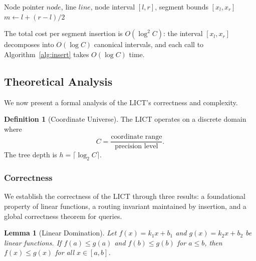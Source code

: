 \documentclass[11pt,a4paper]{article}
\theoremstyle{definition}
\newtheorem{definition}{Definition}
\theoremstyle{plain}
\newtheorem{lemma}{Lemma}
\begin{document}
\begin{algorithm}[H]
\caption{LICT Segment Insertion}
\label{alg:segment-insert}
\begin{algorithmic}[1]
\Require Node pointer $node$, line $line$, node interval $[l, r]$, segment bounds $[x_l, x_r]$
\State \Return {}
\EndIf
{}
\State {} 
\State \Return
\EndIf
\State $m \gets l + (r - l) / 2$
\State {}
\State {}
\end{algorithmic}
\end{algorithm}

The total cost per segment insertion is $O(\log^2 C)$: the interval $[x_l, x_r]$ decomposes into $O(\log C)$ canonical intervals, and each call to Algorithm~\ref{alg:insert} takes $O(\log C)$ time.

\subsection{Theoretical Analysis}

We now present a formal analysis of the LICT's correctness and complexity.

\begin{definition}[Coordinate Universe]
The LICT operates on a discrete domain where
\[
C = \frac{\text{coordinate range}}{\text{precision level}}.
\]
The tree depth is $h = \lceil \log_2 C \rceil$.
\end{definition}

\subsubsection{Correctness}

We establish the correctness of the LICT through three results: a foundational property of linear functions, a routing invariant maintained by insertion, and a global correctness theorem for queries.

\begin{lemma}[Linear Domination]\label{lem:linear-dom}
Let $f(x) = k_1 x + b_1$ and $g(x) = k_2 x + b_2$ be linear functions. If $f(a) \leq g(a)$ and $f(b) \leq g(b)$ for $a \leq b$, then $f(x) \leq g(x)$ for all $x \in [a, b]$.
\end{lemma}
\end{document}
